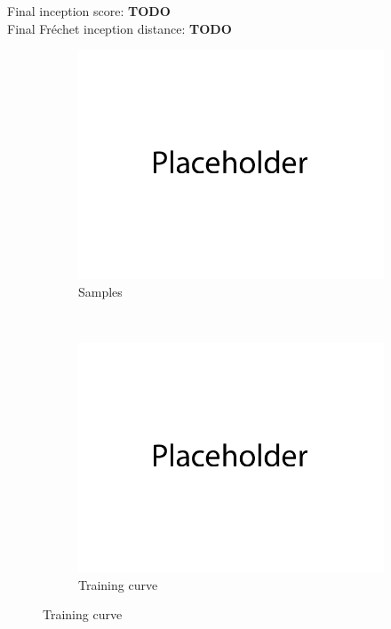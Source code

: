 \documentclass{article}
\begin{document}
Final inception score: \textbf{TODO} \\
Final Fréchet inception distance: \textbf{TODO}
\begin{figure}[H]
    \centering
    \begin{subfigure}{0.6\textwidth}
        \centering
        \includegraphics[width=\textwidth]{figures/q2_samples.png}
        \caption{Samples}
    \end{subfigure}
    \\
    \begin{subfigure}{0.6\textwidth}
        \centering
        \includegraphics[width=\textwidth]{figures/q2_losses.png}
        \caption{Training curve}
    \end{subfigure}
    
\end{figure}
\end{document}
